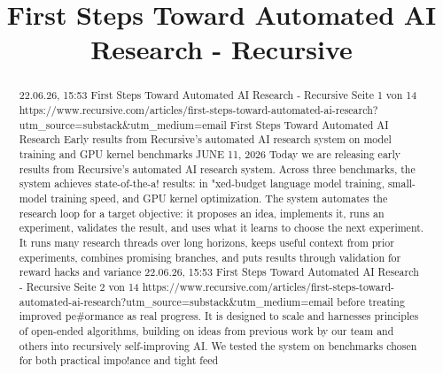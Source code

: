\title{First Steps Toward Automated AI Research - Recursive}

\maketitle

\begin{abstract}
22.06.26, 15:53 First Steps Toward Automated AI Research - Recursive Seite 1 von 14 https://www.recursive.com/articles/first-steps-toward-automated-ai-research?utm\_source=substack\&utm\_medium=email First Steps Toward Automated AI Research Early results from Recursive’s automated AI research system on model training and GPU kernel benchmarks JUNE 11, 2026 Today we are releasing early results from Recursive’s automated AI research system. Across three benchmarks, the system achieves state-of-the-a! results: in "xed-budget language model training, small-model training speed, and GPU kernel optimization. The system automates the research loop for a target objective: it proposes an idea, implements it, runs an experiment, validates the result, and uses what it learns to choose the next experiment. It runs many research threads over long horizons, keeps useful context from prior experiments, combines promising branches, and puts results through validation for reward hacks and variance 22.06.26, 15:53 First Steps Toward Automated AI Research - Recursive Seite 2 von 14 https://www.recursive.com/articles/first-steps-toward-automated-ai-research?utm\_source=substack\&utm\_medium=email before treating improved pe\#ormance as real progress. It is designed to scale and harnesses principles of open-ended algorithms, building on ideas from previous work by our team and others into recursively self-improving AI. We tested the system on benchmarks chosen for both practical impo!ance and tight feed
\end{abstract}

